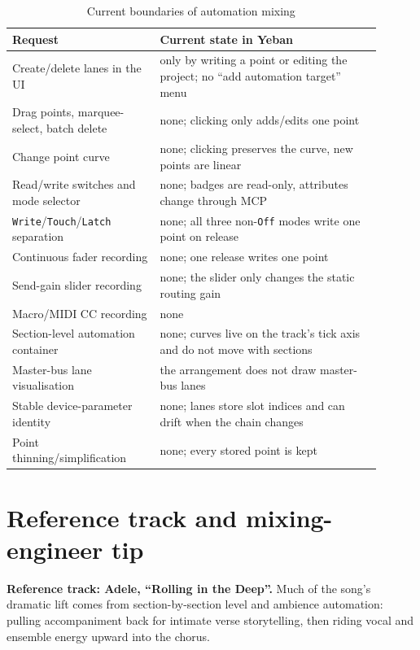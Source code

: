 \begin{table}[htbp]
\centering
\small
\begin{tabular}{@{}p{0.36\linewidth}p{0.54\linewidth}@{}}
\hline
Request & Current state in Yeban \\
\hline
Create/delete lanes in the UI & only by writing a point or editing the project; no ``add automation target'' menu \\
Drag points, marquee-select, batch delete & none; clicking only adds/edits one point \\
Change point curve & none; clicking preserves the curve, new points are linear \\
Read/write switches and mode selector & none; badges are read-only, attributes change through MCP \\
\texttt{Write}/\texttt{Touch}/\texttt{Latch} separation & none; all three non-\texttt{Off} modes write one point on release \\
Continuous fader recording & none; one release writes one point \\
Send-gain slider recording & none; the slider only changes the static routing gain \\
Macro/MIDI CC recording & none \\
Section-level automation container & none; curves live on the track's tick axis and do not move with sections \\
Master-bus lane visualisation & the arrangement does not draw master-bus lanes \\
Stable device-parameter identity & none; lanes store slot indices and can drift when the chain changes \\
Point thinning/simplification & none; every stored point is kept \\
\hline
\end{tabular}
\caption{Current boundaries of automation mixing}
\label{tab:automation-gaps}
\end{table}

\section{Reference track and mixing-engineer tip}

\textbf{Reference track: Adele, ``Rolling in the Deep''.} Much of the song's dramatic lift comes from section-by-section level and ambience automation: pulling accompaniment back for intimate verse storytelling, then riding vocal and ensemble energy upward into the chorus.

